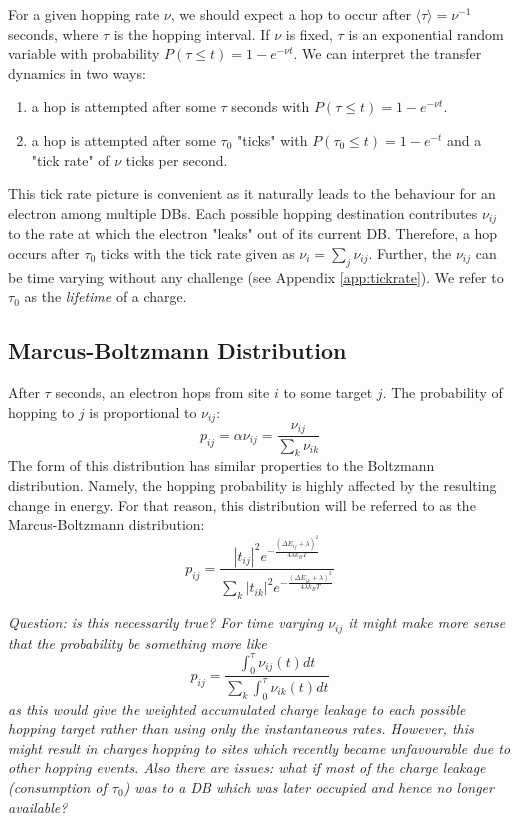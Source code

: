 \documentclass[11pt]{article}
\newcommand{\kt}{k_B T}
\newcommand{\expect}[1]{\langle #1 \rangle}
\begin{document}
For a given hopping rate $\nu$, we should expect a hop to occur after $\expect{\tau} = \nu^{-1}$ seconds, where $\tau$ is the hopping interval. If $\nu$ is fixed, $\tau$ is an exponential random variable with probability $P(\tau \leq t) = 1-e^{-\nu t}$. We can interpret the transfer dynamics in two ways:
\begin{enumerate}
 \item a hop is attempted after some $\tau$ seconds with $P(\tau \leq t) = 1-e^{-\nu t}$.
 \item a hop is attempted after some $\tau_0$ "ticks" with $P(\tau_0 \leq t) = 1-e^{-t}$ and a "tick rate" of $\nu$ ticks per second.
\end{enumerate}
This tick rate picture is convenient as it naturally leads to the behaviour for an electron among multiple DBs. Each possible hopping destination contributes $\nu_{ij}$ to the rate at which the electron "leaks" out of its current DB. Therefore, a hop occurs after $\tau_0$ ticks with the tick rate given as $\nu_i = \sum_j \nu_{ij}$. Further, the $\nu_{ij}$ can be time varying without any challenge (see Appendix \ref{app:tickrate}). We refer to $\tau_0$ as the \emph{lifetime} of a charge.



\subsection{Marcus-Boltzmann Distribution}

After $\tau$ seconds, an electron hops from site $i$ to some target $j$. The probability of hopping to $j$ is proportional to $\nu_{ij}$:
\begin{equation}
p_{ij} = \alpha \nu_{ij} = \frac{\nu_{ij}}{\sum_k \nu_{ik}}
\end{equation}
The form of this distribution has similar properties to the Boltzmann distribution. Namely, the hopping probability is highly affected by the resulting change in energy. For that reason, this distribution will be referred to as the Marcus-Boltzmann distribution:
\[
p_{ij} = \frac{|t_{ij}|^2 e^{-\frac{(\Delta E_{ij}+\lambda)^2}{4\lambda \kt}}}{\sum_k |t_{ik}|^2 e^{-\frac{(\Delta E_{ik}+\lambda)^2}{4\lambda \kt}}}
\]

\emph{Question: is this necessarily true? For time varying $\nu_{ij}$ it might make more sense that the probability be something more like}
\[
p_{ij} = \frac{\int_0^\tau \nu_{ij}(t) dt}{\sum_k \int_0^\tau \nu_{ik}(t) dt}
\]
\emph{as this would give the weighted accumulated charge leakage to each possible hopping target rather than using only the instantaneous rates. However, this might result in charges hopping to sites which recently became unfavourable due to other hopping events. Also there are issues: what if most of the charge leakage (consumption of $\tau_0$) was to a DB which was later occupied and hence no longer available? }
\end{document}
